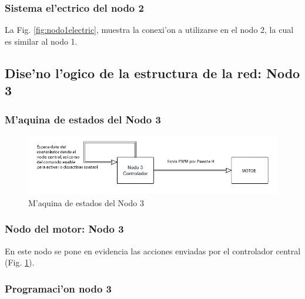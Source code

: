 \subsubsection{Sistema el'ectrico del nodo 2}

La Fig. \ref{fig:nodo1electric}, muestra la conexi'on a utilizarse en el nodo 2, la cual es similar al nodo 1.
\subsection{Dise'no l'ogico de la estructura de la red: Nodo 3}
\subsubsection{M'aquina de estados del Nodo 3}
\begin{figure}[ht]
	\centering
		\includegraphics[scale=0.65]{nodo3}
	\caption{M'aquina de estados del Nodo 3}
	\label{fig:nodo3}
\end{figure}

\subsubsection{Nodo del motor: Nodo 3 }
En este nodo se pone en evidencia las acciones enviadas por el controlador central (Fig. \ref{fig:nodo3}).

\subsubsection{Programaci'on nodo 3}

